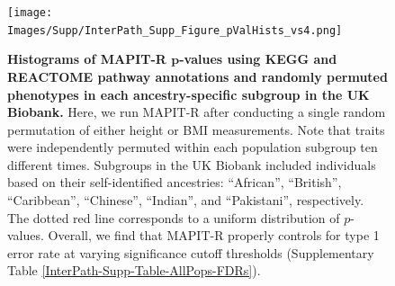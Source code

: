 \documentclass[10pt]{article}
\begin{document}
\begin{figure}[htbp]
\centering
\vspace*{-2cm}
\texttt{[image: Images/Supp/InterPath\_Supp\_Figure\_pValHists\_vs4.png]}
\caption{\textbf{Histograms of MAPIT-R $\bm{p}$-values using KEGG and REACTOME pathway annotations and randomly permuted phenotypes in each ancestry-specific subgroup in the UK Biobank.} Here, we run MAPIT-R after conducting a single random permutation of either height or BMI measurements. Note that traits were independently permuted within each population subgroup ten different times. Subgroups in the UK Biobank included individuals based on their self-identified ancestries: ``African'', ``British'', ``Caribbean'', ``Chinese'', ``Indian'', and ``Pakistani'', respectively. The dotted red line corresponds to a uniform distribution of $p$-values. Overall, we find that MAPIT-R properly controls for type 1 error rate at varying significance cutoff thresholds (Supplementary Table \ref{InterPath-Supp-Table-AllPops-FDRs}).}
\label{InterPath-Supp-Figure-10perms-pValHists}
\end{figure}
\clearpage
\setlength{\footskip}{1cm}

\end{document}
